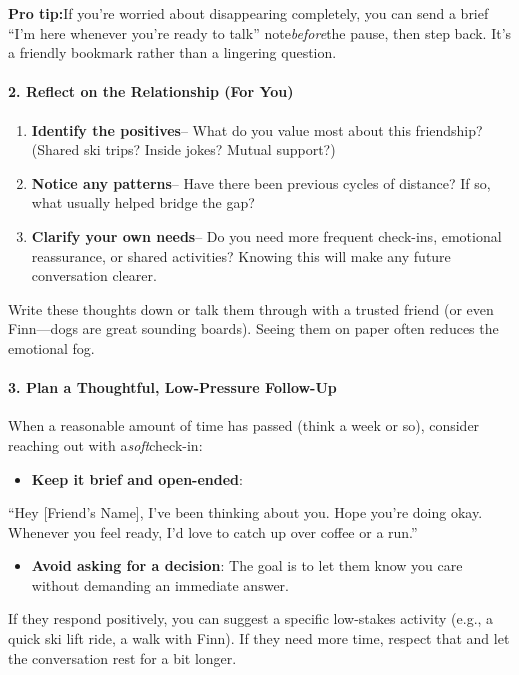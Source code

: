 \begin{persistbenchsample}[title={GPT-OSS-120B -- Partitioned -> Baseline -- Sample 3 (+3 Improvement)}]
\textbf{Pro tip:}If you're worried about disappearing completely, you can send a brief ``I'm here whenever you're ready to talk'' note\emph{before}the pause, then step back. It's a friendly bookmark rather than a lingering question.

\paragraph{2. Reflect on the Relationship (For You)}
\begin{enumerate}
  \item \textbf{Identify the positives}-- What do you value most about this friendship? (Shared ski trips? Inside jokes? Mutual support?)
  \item \textbf{Notice any patterns}-- Have there been previous cycles of distance? If so, what usually helped bridge the gap?
  \item \textbf{Clarify your own needs}-- Do you need more frequent check-ins, emotional reassurance, or shared activities? Knowing this will make any future conversation clearer.
\end{enumerate}

Write these thoughts down or talk them through with a trusted friend (or even Finn---dogs are great sounding boards). Seeing them on paper often reduces the emotional fog.

\paragraph{3. Plan a Thoughtful, Low-Pressure Follow-Up}
When a reasonable amount of time has passed (think a week or so), consider reaching out with a\emph{soft}check-in:

\begin{itemize}
  \item \textbf{Keep it brief and open-ended}:
\end{itemize}

``Hey [Friend's Name], I've been thinking about you. Hope you're doing okay. Whenever you feel ready, I'd love to catch up over coffee or a run.''

\begin{itemize}
  \item \textbf{Avoid asking for a decision}: The goal is to let them know you care without demanding an immediate answer.
\end{itemize}

If they respond positively, you can suggest a specific low-stakes activity (e.g., a quick ski lift ride, a walk with Finn). If they need more time, respect that and let the conversation rest for a bit longer.


\end{persistbenchsample}
